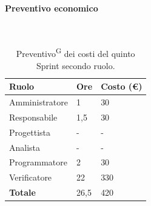 \documentclass[8pt]{article}
\newcommand{\glossterm}[1]{#1\textsuperscript{G}} %
\newcommand{\subsubsubsection}[1]{\paragraph{#1}\mbox{}\\}
\begin{document}
\subsubsubsection{Preventivo economico}
\begin{table}[ht!]
	\centering
	\begin{tabular}{p{4cm} p{1cm} p{2cm}}
        \toprule
        \textbf{Ruolo} & \textbf{Ore} & \textbf{Costo (€)} \\
        \midrule
        Amministratore & 1 & 30 \\
        Responsabile & 1,5 & 30 \\
        Progettista & - & - \\
        Analista & - & - \\
        Programmatore & 2 & 30 \\
        Verificatore & 22 & 330 \\
        \midrule
        \textbf{Totale} & 26,5 & 420 \\
        \bottomrule
    \end{tabular}
    \caption{\glossterm{Preventivo} dei costi del quinto Sprint secondo ruolo.}
	\label{table:Preventivo dei costi del quinto Sprint secondo ruolo}
\end{table}
\clearpage
\end{document}
